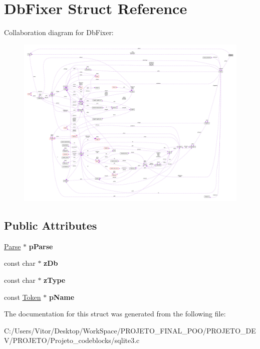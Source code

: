 \hypertarget{struct_db_fixer}{\section{Db\-Fixer Struct Reference}
\label{struct_db_fixer}
}


Collaboration diagram for Db\-Fixer\-:\nopagebreak
\begin{figure}[H]
\begin{center}
\leavevmode
\includegraphics[width=350pt]{struct_db_fixer__coll__graph}
\end{center}
\end{figure}
\subsection*{Public Attributes}
\begin{DoxyCompactItemize}
\item 
\hypertarget{struct_db_fixer_ac5c9b8bca3b05a66faea11dd998bf6f6}{\hyperlink{struct_parse}{Parse} $\ast$ {\bfseries p\-Parse}}\label{struct_db_fixer_ac5c9b8bca3b05a66faea11dd998bf6f6}

\item 
\hypertarget{struct_db_fixer_aba91df5965a99915d9180805d02c4a7f}{const char $\ast$ {\bfseries z\-Db}}\label{struct_db_fixer_aba91df5965a99915d9180805d02c4a7f}

\item 
\hypertarget{struct_db_fixer_ae4748d9e97560b7b332527434408c2e8}{const char $\ast$ {\bfseries z\-Type}}\label{struct_db_fixer_ae4748d9e97560b7b332527434408c2e8}

\item 
\hypertarget{struct_db_fixer_aedee20e10de7337651b84656ee81b39c}{const \hyperlink{struct_token}{Token} $\ast$ {\bfseries p\-Name}}\label{struct_db_fixer_aedee20e10de7337651b84656ee81b39c}

\end{DoxyCompactItemize}


The documentation for this struct was generated from the following file\-:\begin{DoxyCompactItemize}
\item 
C\-:/\-Users/\-Vitor/\-Desktop/\-Work\-Space/\-P\-R\-O\-J\-E\-T\-O\-\_\-\-F\-I\-N\-A\-L\-\_\-\-P\-O\-O/\-P\-R\-O\-J\-E\-T\-O\-\_\-\-D\-E\-V/\-P\-R\-O\-J\-E\-T\-O/\-Projeto\-\_\-codeblocks/sqlite3.\-c\end{DoxyCompactItemize}
